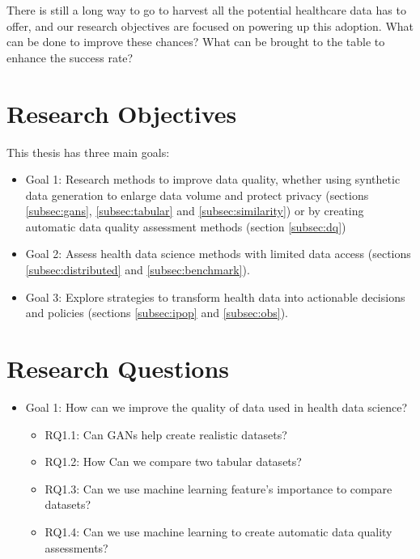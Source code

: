 There is still a long way to go to harvest all the potential healthcare data has to offer, and our research objectives are focused on powering up this adoption. What can be done to improve these chances? What can be brought to the table to enhance the success rate?







\section{Research Objectives}
This thesis has three main goals:


\begin{itemize}
    \item Goal 1: Research methods to improve data quality, whether using synthetic data generation to enlarge data volume and protect privacy (sections \ref{subsec:gans}, \ref{subsec:tabular} and \ref{subsec:similarity}) or by creating automatic data quality assessment methods (section \ref{subsec:dq})

    \item Goal 2: Assess health data science  methods with limited data access (sections \ref{subsec:distributed} and \ref{subsec:benchmark}).

    \item Goal 3: Explore strategies to transform health data into actionable decisions and policies (sections  \ref{subsec:ipop} and \ref{subsec:obs}).
\end{itemize}


\section{Research Questions}

\begin{itemize}
    \item Goal 1: How can we improve the quality of data used in health data science?
    \begin{itemize}
        \item RQ1.1: Can GANs help create realistic datasets?
        \item RQ1.2: How Can we compare two tabular datasets?
        \item RQ1.3: Can we use machine learning feature's importance to compare datasets?
        \item RQ1.4: Can we use machine learning to create automatic data quality assessments?
    \end{itemize}
\end{itemize}

